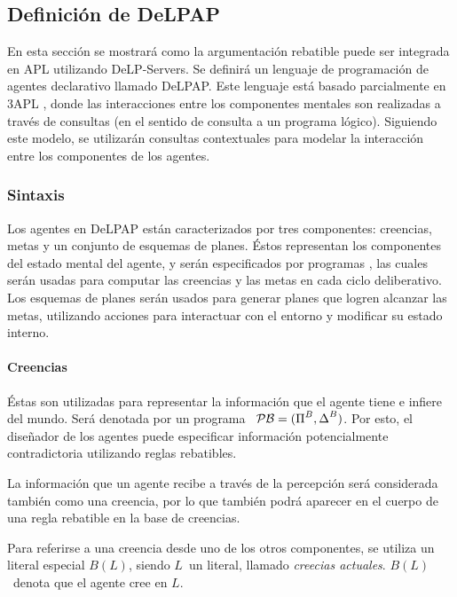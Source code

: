 \subsection{Definición de DeLPAP}

En esta sección se mostrará como la argumentación rebatible puede ser 
integrada en APL utilizando DeLP-Servers. Se definirá un lenguaje de 
programación de agentes declarativo llamado DeLPAP. Este lenguaje está 
basado parcialmente en 3APL %
, donde las interacciones entre los componentes mentales son realizadas a
través de consultas (en el sentido de consulta a un programa lógico).
Siguiendo este modelo, se utilizarán consultas contextuales para modelar la 
interacción entre los componentes de los agentes.

\subsubsection{Sintaxis}

Los agentes en DeLPAP están caracterizados por tres componentes: creencias,
metas y un conjunto de esquemas de planes. %
Éstos representan los componentes del estado
mental del agente, y serán especificados por programas \DLP, las cuales
serán usadas para computar las creencias y las metas en cada ciclo 
deliberativo. Los esquemas de planes serán usados para generar planes que 
logren alcanzar las metas, utilizando acciones para interactuar con el 
entorno y modificar su estado interno.

\paragraph{Creencias}

Éstas son utilizadas para representar la información que el agente tiene
e infiere del mundo. Será denotada por un programa \DLP\ $\mathcal{PB} = (\mbox{$\Pi$}^B, \mbox{$\Delta$}^B)$.
Por esto, el diseñador de los agentes puede especificar información 
potencialmente contradictoria utilizando reglas rebatibles. %

La información que un agente recibe a través de la percepción será 
considerada también como una creencia, por lo que también podrá aparecer en el
cuerpo de una regla rebatible en la base de creencias. %

Para referirse a una creencia desde uno de los otros componentes, se utiliza
un literal especial $B(L)$, siendo $L$\ un literal, llamado \textit{creecias
actuales}. $B(L)$\ denota que el agente cree en $L$.

